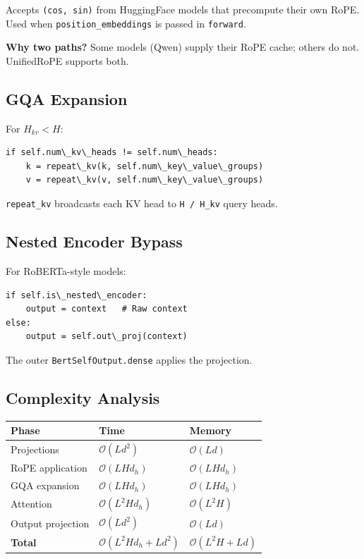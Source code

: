 Accepts \texttt{(cos, sin)} from HuggingFace models that precompute their own 
RoPE. Used when \texttt{position\_embeddings} is passed in \texttt{forward}.

\textbf{Why two paths?} Some models (Qwen) supply their RoPE cache; others do 
not. UnifiedRoPE supports both.

\subsection{GQA Expansion}

For $H_{kv} < H$:

\begin{lstlisting}
if self.num\_kv\_heads != self.num\_heads:
    k = repeat\_kv(k, self.num\_key\_value\_groups)
    v = repeat\_kv(v, self.num\_key\_value\_groups)
\end{lstlisting}

\texttt{repeat\_kv} broadcasts each KV head to \texttt{H / H\_{kv}} query heads.

\subsection{Nested Encoder Bypass}

For RoBERTa-style models:

\begin{lstlisting}
if self.is\_nested\_encoder:
    output = context   # Raw context
else:
    output = self.out\_proj(context)
\end{lstlisting}

The outer \texttt{BertSelfOutput.dense} applies the projection.

\subsection{Complexity Analysis}

\begin{table}[H]
\centering
\small
\begin{tabular}{lll}
\toprule
\textbf{Phase} & \textbf{Time} & \textbf{Memory} \\
\midrule
Projections & $\mathcal{O}(L d^2)$ & $\mathcal{O}(L d)$ \\
RoPE application & $\mathcal{O}(L H d_h)$ & $\mathcal{O}(L H d_h)$ \\
GQA expansion & $\mathcal{O}(L H d_h)$ & $\mathcal{O}(L H d_h)$ \\
Attention & $\mathcal{O}(L^2 H d_h)$ & $\mathcal{O}(L^2 H)$ \\
Output projection & $\mathcal{O}(L d^2)$ & $\mathcal{O}(L d)$ \\
\textbf{Total} & $\mathcal{O}(L^2 H d_h + L d^2)$ & $\mathcal{O}(L^2 H + L d)$ \\
\bottomrule
\end{tabular}
\end{table}

